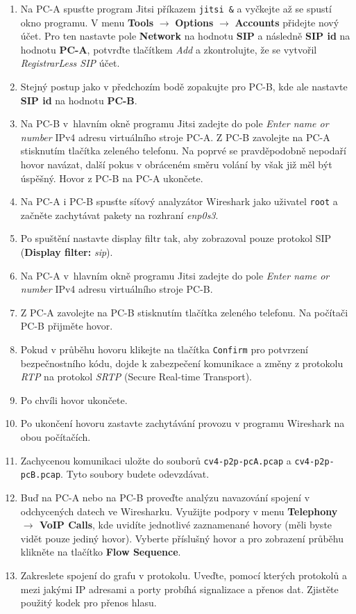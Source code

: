 \begin{enumerate}
    \item Na PC-A spusťte program Jitsi příkazem \texttt{jitsi \&} a vyčkejte až se spustí okno programu.
	V menu {\bf Tools} $\rightarrow$ {\bf Options} $\rightarrow$ {\bf Accounts} přidejte nový účet. Pro ten nastavte pole {\bf Network} na hodnotu {\bf SIP} a následně {\bf SIP id} na hodnotu {\bf PC-A}, potvrďte tlačítkem \emph{Add} a zkontrolujte, že se vytvořil {\it RegistrarLess SIP} účet.
    \item Stejný postup jako v předchozím bodě zopakujte pro PC-B, kde ale nastavte {\bf SIP id} na hodnotu {\bf PC-B}.
	\item Na PC-B v hlavním okně programu Jitsi zadejte do pole {\it Enter name or number} IPv4 adresu virtuálního stroje PC-A.
	Z PC-B zavolejte na PC-A stisknutím tlačítka zeleného telefonu. Na poprvé se pravděpodobně nepodaří hovor navázat, další pokus v obráceném směru volání by však již měl být úspěšný.
	Hovor z PC-B na PC-A ukončete.
	\item Na PC-A i PC-B spusťte síťový analyzátor Wireshark jako uživatel \texttt{root} a začněte zachytávat pakety na rozhraní \emph{enp0s3}.
    \item Po spuštění nastavte display filtr tak, aby zobrazoval pouze protokol SIP (\textbf{Display filter:} \emph{sip}).
    \item Na PC-A v hlavním okně programu Jitsi zadejte do pole {\it Enter name or number} IPv4 adresu virtuálního stroje PC-B.
    \item Z PC-A zavolejte na PC-B stisknutím tlačítka zeleného telefonu. Na počítači PC-B přijměte hovor.
	\item Pokud v průběhu hovoru klikejte na tlačítka \texttt{Confirm} pro potvrzení bezpečnostního kódu, dojde k zabezpečení komunikace a změny z protokolu \emph{RTP} na protokol \emph{SRTP} (Secure Real-time Transport).
	\item Po chvíli hovor ukončete.
	\item Po ukončení hovoru zastavte zachytávání provozu v programu Wireshark na obou počítačích.
	\item Zachycenou komunikaci uložte do souborů \texttt{cv4-p2p-pcA.pcap} a \texttt{cv4-p2p-pcB.pcap}. Tyto soubory budete odevzdávat.
    \item Buď na PC-A nebo na PC-B proveďte analýzu navazování spojení v odchycených datech ve Wiresharku. Využijte podpory v menu {\bf Telephony $\rightarrow$ VoIP Calls}, kde uvidíte jednotlivé zaznamenané hovory (měli byste vidět pouze jediný hovor). Vyberte příslušný hovor a pro zobrazení průběhu klikněte na tlačítko {\bf Flow Sequence}.
    \item Zakreslete spojení do grafu v protokolu. Uveďte, pomocí kterých protokolů a mezi jakými IP adresami a porty probíhá signalizace a přenos dat. Zjistěte použitý kodek pro přenos hlasu.\\


\end{enumerate}

